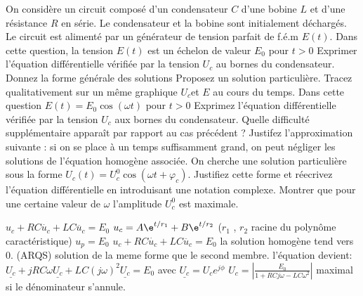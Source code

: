 \begin{Exercise}[title=Étude d'un circuit RLC]
	On considère un circuit composé d'un condensateur $C$ d'une bobine $L$ et d'une résistance $R$ en série. Le condensateur et la bobine sont initialement déchargés. Le circuit est alimenté par un générateur de tension parfait de f.é.m $E(t)$.
	\Question Dans cette question, la tension $E(t)$ est un échelon de valeur $E_0$ pour $t>0$
		\subQuestion Exprimer l'équation différentielle vérifiée par la tension $U_c$ au bornes du condensateur.
		\subQuestion Donnez la forme générale des solutions
		\subQuestion Proposez un solution particulière.
		\subQuestion Tracez qualitativement sur un même graphique $U_c$et $E$ au cours du temps.
	\Question Dans cette question $E(t)=E_0\cos(\omega t)$ pour $t>0$
		\subQuestion Exprimez l'équation différentielle vérifiée par la tension $U_c$ aux bornes du condensateur. Quelle difficulté
		supplémentaire apparaît par rapport au cas précédent ?
		\subQuestion Justifez l'approximation suivante : si on se place à un temps suffisamment grand, on peut négliger les
		solutions de l'équation homogène associée.
		\subQuestion  On cherche une solution particulière sous la forme $U_c(t)=U_c^0 \cos(\omega t +\varphi_c)$. Justifiez cette forme et réecrivez l'équation différentielle en introduisant une notation complexe.
		\subQuestion Montrer que pour une certaine valeur de $\omega$ l'amplitude $U_c^0$ est maximale.
\end{Exercise}
\begin{Answer}
	\Question
		\subQuestion $u_c + RC\dot{u_c}+LC\ddot{u_c} = E_0$
		\subQuestion $u_c = A\e^{t/r_1} + B\e^{t/r_2}$ ($r_1$ , $r_2$ racine du polynôme caractéristique)
		\subQuestion $u_p=E_0$
	\Question
		\subQuestion $u_c + RC\dot{u_c}+LC\ddot{u_c} = E_0$
		\subQuestion la solution homogène tend vers 0. (ARQS)
		\subQuestion solution de la meme forme que le second membre. l'équation
        devient:
        $\underline{U_c}+jRC\omega \underline{U_c}+
        LC(j\omega)^2\underline{U_c}=E_0$ avec $\underline{U_c}=U_ce^{j\phi}$
        $U_c= \left|\frac{E_0}{1+RCj\omega-LC\omega^2}\right|$ maximal si le dénominateur
        s'annule.
\end{Answer}

